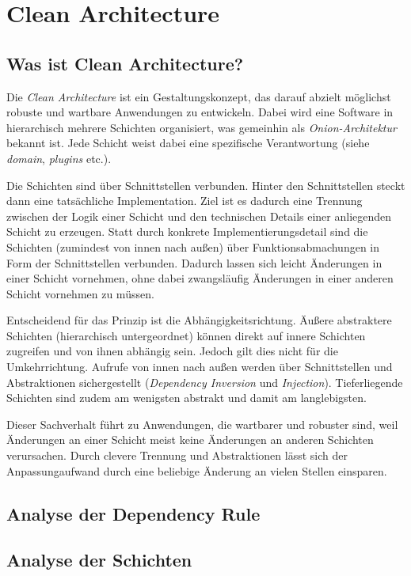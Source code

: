 \chapter{Clean Architecture}

\section{Was ist Clean Architecture?}
Die \textit{Clean Architecture} ist ein Gestaltungskonzept, das darauf
abzielt möglichst robuste und wartbare Anwendungen zu entwickeln. Dabei
wird eine Software in hierarchisch mehrere Schichten organisiert, was
gemeinhin als \textit{Onion-Architektur} bekannt ist. Jede Schicht
weist dabei eine spezifische Verantwortung (siehe \textit{domain}, 
\textit{plugins} etc.). 

Die Schichten sind über Schnittstellen verbunden. Hinter den
Schnittstellen steckt dann eine tatsächliche Implementation. Ziel ist
es dadurch eine Trennung zwischen der Logik einer Schicht und den
technischen Details einer anliegenden Schicht zu erzeugen. Statt durch
konkrete Implementierungsdetail sind die Schichten (zumindest von innen
nach außen) über
Funktionsabmachungen in Form der Schnittstellen verbunden. Dadurch
lassen sich leicht Änderungen in einer Schicht vornehmen, ohne dabei
zwangsläufig Änderungen in einer anderen Schicht vornehmen zu müssen.

Entscheidend für das Prinzip ist die Abhängigkeitsrichtung. Äußere
abstraktere Schichten (hierarchisch untergeordnet) können direkt auf
innere Schichten zugreifen und von ihnen abhängig sein. Jedoch gilt
dies nicht für die Umkehrrichtung. Aufrufe von innen nach außen werden
über Schnittstellen und Abstraktionen sichergestellt 
(\textit{Dependency Inversion} und \textit{Injection}).
Tieferliegende Schichten sind zudem am wenigsten abstrakt und damit
am langlebigsten.

Dieser Sachverhalt führt zu Anwendungen, die wartbarer und robuster sind,
weil Änderungen an einer Schicht meist keine Änderungen an anderen
Schichten verursachen. Durch clevere Trennung und Abstraktionen lässt
sich der Anpassungaufwand durch eine beliebige Änderung an vielen Stellen
einsparen.

\section{Analyse der Dependency Rule}

\section{Analyse der Schichten}